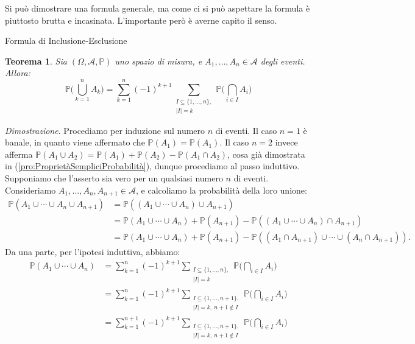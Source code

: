 \documentclass[11pt]{book}
\makeatletter
\theoremstyle{Definizione}
\theoremstyle{TeoremaProposizioneLemmaCorollario}
\newtheorem{myteo}{Teorema}[section]
\theoremstyle{OsservazioneNota}
\renewenvironment{proof}[1][\proofname]{\par
  \normalfont \topsep6\p@\@plus6\p@\relax
  \trivlist
  \item[\hskip\labelsep
        \itshape
    #1\@addpunct{.}]\ignorespaces
}{%
  \endtrivlist\@endpefalse
}
\renewcommand{\P}{\mathbb{P}}
\renewenvironment{proof}{\textsl{Dimostrazione}.}{}
\makeatother
\begin{document}
Si può dimostrare una formula generale, ma come ci si può aspettare la formula è piuttosto brutta e incasinata. L'importante però è averne capito il senso.
\begin{boxteo}{Formula di Inclusione-Esclusione}
\begin{myteo}\label{teo:Inclusione-Esclusione}
Sia $(\Omega,\mathcal{A},\P)$ uno spazio di misura, e $A_1,\dots,A_n\in \mathcal{A}$ degli eventi. Allora:
$$
\P\Bigg(\bigcup_{k = 1}^n A_k\Bigg) = \sum_{k = 1}^n (-1)^{k+1}\sum_{\substack{I \subseteq \{1,\dots,n\},\\ |I| = k}} \P\Bigg(\bigcap_{i\in I} A_i\Bigg)
$$
\end{myteo}
\tcblower
\begin{proof}
Procediamo per induzione sul numero $n$ di eventi. Il caso $n = 1$ è banale, in quanto viene affermato che $\P(A_1) = \P(A_1)$. Il caso $n = 2$ invece afferma $\P(A_1 \cup A_2) = \P(A_1) + \P(A_2) - \P(A_1\cap A_2)$, cosa già dimostrata in (\ref{pro:ProprietàSempliciProbabilità}), dunque procediamo al passo induttivo.\\
Supponiamo che l'asserto sia vero per un qualsiasi numero $n$ di eventi. Consideriamo $A_1,\dots,A_n,A_{n+1}\in \mathcal{A}$, e calcoliamo la probabilità della loro unione:
\begin{align*}
\P(A_1 \cup \cdots \cup A_n \cup A_{n+1}) &= \P((A_1 \cup \cdots \cup A_n) \cup A_{n+1}) \\
&= \P(A_1\cup \cdots \cup A_n) + \P(A_{n+1}) - \P((A_1\cup \cdots \cup A_{n}) \cap A_{n+1})\\
&= \P(A_1\cup \cdots \cup A_n) + \P(A_{n+1}) - \P((A_1 \cap A_{n+1}) \cup \cdots \cup (A_n\cap A_{n+1})).
\end{align*}
Da una parte, per l'ipotesi induttiva, abbiamo:
\begin{align}
\P(A_1 \cup \cdots \cup A_n) &= \sum_{k = 1}^n (-1)^{k+1} \sum_{\substack{ I \subseteq \{1,\dots,n\},\\ |I| = k}}\P\Bigg(\bigcap_{i\in I} A_i\Bigg) \nonumber \\
&=\sum_{k = 1}^n (-1)^{k+1} \sum_{\substack{ I \subseteq \{1,\dots,n+1\},\\ |I| = k,\ n+1\notin I}}\P\Bigg(\bigcap_{i\in I} A_i\Bigg) \nonumber \\
&= \sum_{k = 1}^{n+1} (-1)^{k+1} \sum_{\substack{ I \subseteq \{1,\dots,n+1\},\\ |I| = k,\ n+1\notin I}}\P\Bigg(\bigcap_{i\in I} A_i\Bigg) \label{eq:Dim:EsclusioneInclusione1}
\end{align}

\end{proof}
\end{boxteo}
\end{document}
